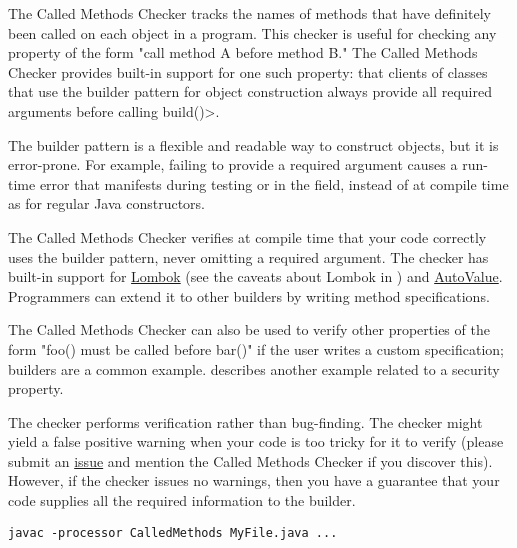 \htmlhr
{}

The Called Methods Checker tracks the names of methods that have definitely been called
on each object in a program. This checker is useful for checking any property of the form
"call method A before method B." The Called Methods Checker provides built-in support for one
such property: that clients of classes that use the builder pattern for object construction
always provide all required arguments before calling \<build()>.

The builder pattern is a flexible and readable way to construct objects, but it is error-prone.
For example, failing to provide a required argument causes a run-time error that manifests during testing
or in the field, instead of at compile time as for regular Java constructors.

The Called Methods Checker verifies at compile time that your code correctly uses the builder pattern,
never omitting a required argument. The checker has built-in support for \href{https://projectlombok.org/}{Lombok}
(see the caveats about Lombok in ) and
\href{https://github.com/google/auto/blob/master/value/userguide/index.md}{AutoValue}.
Programmers can extend it to other builders by writing method specifications.

The Called Methods Checker can also be used to verify other properties of the form "foo() must be called
before bar()" if the user writes a custom specification; builders are a common example.
 describes another example related to a security property.

The checker performs verification rather than bug-finding.  The checker
might yield a false positive warning when your code is too tricky for it to
verify (please submit an
\href{https://github.com/typetools/checker-framework/issues}{issue} and mention the Called Methods Checker if
you discover this).  However, if the checker issues no warnings, then you
have a guarantee that your code supplies all the required information to
the builder.


\begin{Verbatim}
javac -processor CalledMethods MyFile.java ...
\end{Verbatim}


